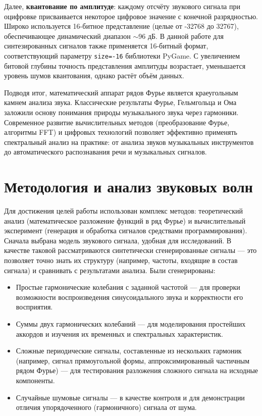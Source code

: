 \documentclass[bachelor, och, diploma]{SCWorks}
\begin{document}
Далее, \textbf{квантование по амплитуде}: каждому отсчёту звукового сигнала при оцифровке присваивается некоторое цифровое значение с конечной разрядностью. Широко используется 16-битное представление (целые от -32768 до 32767), обеспечивающее динамический диапазон $\sim$96 дБ. В данной работе для синтезированных сигналов также применяется 16-битный формат, соответствующий параметру \texttt{size=-16} библиотеки PyGame. С увеличением битовой глубины точность представления амплитуды возрастает, уменьшается уровень шумов квантования, однако растёт объём данных.

Подводя итог, математический аппарат рядов Фурье является краеугольным камнем анализа звука. Классические результаты Фурье, Гельмгольца и Ома заложили основу понимания природы музыкального звука через гармоники. Современное развитие вычислительных методов (преобразование Фурье, алгоритмы FFT) и цифровых технологий позволяет эффективно применять спектральный анализ на практике: от анализа звуков музыкальных инструментов до автоматического распознавания речи и музыкальных сигналов.


\section{Методология и анализ звуковых волн}

Для достижения целей работы использован комплекс методов: теоретический анализ (математическое разложение функций в ряд Фурье) и вычислительный эксперимент (генерация и обработка сигналов средствами программирования). Сначала выбрана модель звукового сигнала, удобная для исследований. В качестве таковой рассматриваются синтетически сгенерированные сигналы --- это позволяет точно знать их структуру (например, частоты, входящие в состав сигнала) и сравнивать с результатами анализа. Были сгенерированы:
\begin{itemize}
    \item Простые гармонические колебания с заданной частотой --- для проверки возможности воспроизведения синусоидального звука и корректности его восприятия.
    \item Суммы двух гармонических колебаний --- для моделирования простейших аккордов и изучения их временных и спектральных характеристик.
    \item Сложные периодические сигналы, составленные из нескольких гармоник (например, сигнал прямоугольной формы, аппроксимированный частичным рядом Фурье) --- для тестирования разложения сложного сигнала на исходные компоненты.
    \item Случайные шумовые сигналы --- в качестве контроля и для демонстрации отличия упорядоченного (гармоничного) сигнала от шума.
\end{itemize}
\end{document}
